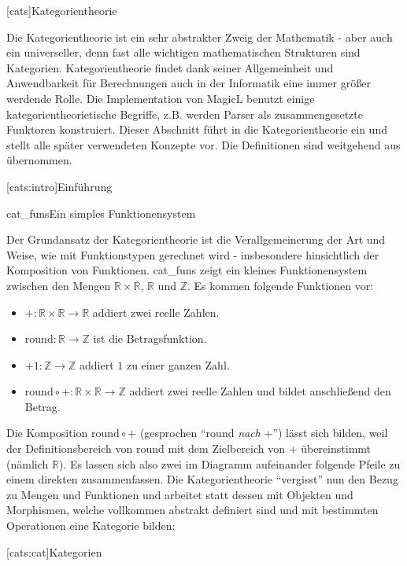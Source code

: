 \documentclass[11pt, a4paper, bibgerm]{book}
\newcommand\lchapter{}
\newcommand\lsection{}
\newcommand\abb{}
\newcommand\fig{}
\newcommand\ato{\rightarrow} %
\begin{document}
\lchapter[cats]{Kategorientheorie}

Die Kategorientheorie ist ein sehr abstrakter Zweig der Mathematik -
aber auch ein universeller, denn fast alle wichtigen mathematischen
Strukturen sind Kategorien. Kategorientheorie findet dank seiner
Allgemeinheit und Anwendbarkeit für Berechnungen auch in der Informatik
eine immer größer werdende Rolle. Die Implementation von MagicL benutzt
einige kategorientheorietische Begriffe, z.B. werden Parser als
zusammengesetzte Funktoren konstruiert. Dieser Abschnitt führt in die
Kategorientheorie ein und stellt alle später verwendeten Konzepte
vor. Die Definitionen sind weitgehend aus \cite{Grundlagen} übernommen.

\lsection[cats:intro]{Einführung}

\fig{cat_funs}{Ein simples Funktionensystem}

Der Grundansatz der Kategorientheorie ist die Verallgemeinerung der
Art und Weise, wie mit Funktionstypen gerechnet wird - insbesondere
hinsichtlich der Komposition von Funktionen. \abb{cat_funs} zeigt ein
kleines Funktionensystem zwischen den Mengen $\mathbb{R} \times
\mathbb{R}$, $\mathbb{R}$ und $\mathbb{Z}$. Es kommen folgende
Funktionen vor:
\begin{itemize}
\item $+ : \mathbb{R} \times \mathbb{R} \ato \mathbb{R}$ addiert zwei
  reelle Zahlen.
\item $\mathrm{round} : \mathbb{R} \ato \mathbb{Z}$ ist die Betragsfunktion.
\item $+1 : \mathbb{Z} \ato \mathbb{Z}$ addiert $1$ zu einer ganzen Zahl.
\item $\mathrm{round} \circ + : \mathbb{R} \times \mathbb{R} \ato \mathbb{Z}$
  addiert zwei reelle Zahlen und bildet anschließend den Betrag.
\end{itemize}

Die Komposition $\mathrm{round} \circ +$ (gesprochen "`round \textit{nach}
+"') lässt sich bilden, weil der Definitionsbereich von $\mathrm{round}$
mit dem Zielbereich von $+$ übereinstimmt (nämlich $\mathbb{R}$). Es
lassen sich also zwei im Diagramm aufeinander folgende Pfeile zu einem
direkten zusammenfassen. Die Kategorientheorie "`vergisst"' nun den
Bezug zu Mengen und Funktionen und arbeitet statt dessen mit Objekten
und Morphismen, welche vollkommen abstrakt definiert sind und mit
bestimmten Operationen eine Kategorie bilden:

\lsection[cats:cat]{Kategorien}
\end{document}
